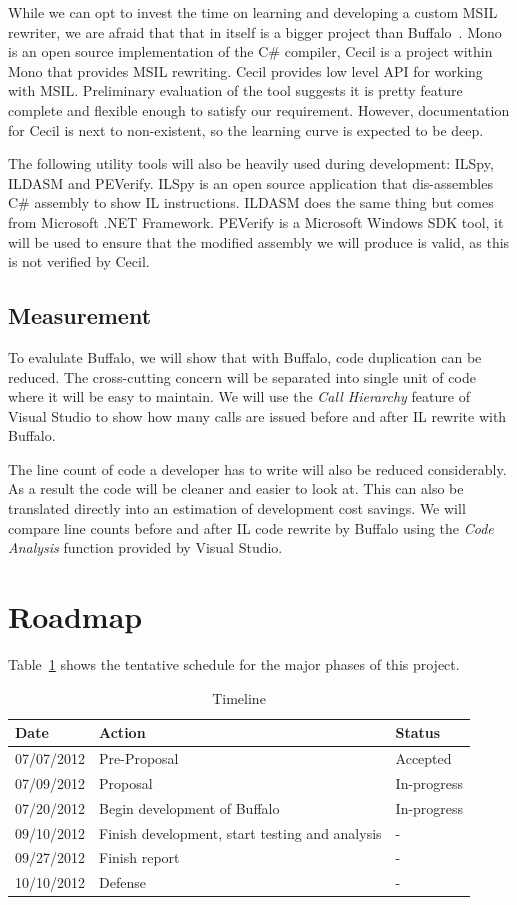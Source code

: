 While we can opt to invest the time on learning and developing a custom MSIL rewriter, we are afraid that that in itself is a bigger project than Buffalo~\cite{msil_text}. Mono is an open source implementation of the C\# compiler, Cecil is a project within Mono that provides MSIL rewriting. Cecil provides low level API for working with MSIL. Preliminary evaluation of the tool suggests it is pretty feature complete and flexible enough to satisfy our requirement. However, documentation for Cecil is next to non-existent, so the learning curve is expected to be deep.

The following utility tools will also be heavily used during development: ILSpy, ILDASM and PEVerify. ILSpy is an open source application that dis-assembles C\# assembly to show IL instructions. ILDASM does the same thing but comes from Microsoft .NET Framework. PEVerify is a Microsoft Windows SDK tool, it will be used to ensure that the modified assembly we will produce is valid, as this is not verified by Cecil.

\subsection{Measurement}
To evalulate Buffalo, we will show that with Buffalo, code duplication can be reduced. The cross-cutting concern will be separated into single unit of code where it will be easy to maintain. We will use the {\em Call Hierarchy} feature of Visual Studio to show how many calls are issued before and after IL rewrite with Buffalo. 

The line count of code a developer has to write will also be reduced considerably. As a result the code will be cleaner and easier to look at. This can also be translated directly into an estimation of development cost savings. We will compare line counts before and after IL code rewrite by Buffalo using the {\em Code Analysis} function provided by Visual Studio.

\section{Roadmap}
Table~\ref{tab:roadmap_tbl} shows the tentative schedule for the major phases of this project.

\begin{table}[H]
\centering
\begin{tabular}{|l|l|l|}
\hline
Date & Action & Status\\
\hline
07/07/2012 & Pre-Proposal & Accepted\\
07/09/2012 & Proposal & In-progress\\
07/20/2012 & Begin development of Buffalo & In-progress\\
09/10/2012 & Finish development, start testing and analysis & - \\
09/27/2012 & Finish report & - \\
10/10/2012 & Defense & - \\
\hline
\end{tabular}
\caption{Timeline}
\label{tab:roadmap_tbl}
\end{table}

